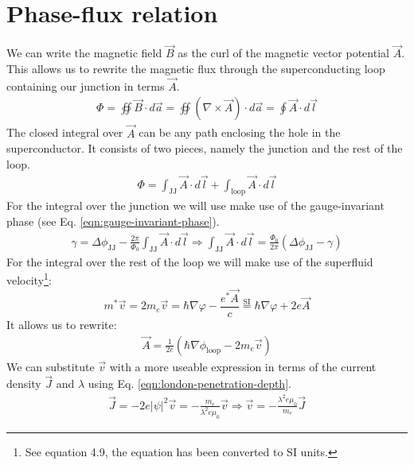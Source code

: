 \section{Phase-flux relation}
\label{app:derivation-phase-flux-relation}
We can write the magnetic field $\vec{B}$ as the curl of the magnetic vector potential $\vec{A}$. This allows us to rewrite the magnetic flux through the superconducting loop containing our junction in terms $\vec{A}$.
\begin{align}
	\Phi = \oiint \vec{B} \cdot d\vec{a} = \oiint \left(\nabla \times \vec{A}\right) \cdot d\vec{a} = \oint \vec{A} \cdot d\vec{l}
\end{align}
The closed integral over $\vec{A}$ can be any path enclosing the hole in the superconductor. It consists of two pieces, namely the junction and the rest of the loop.
\begin{align}
	\Phi = \int_{\text{JJ}} \vec{A} \cdot d\vec{l} + \int_{\text{loop}} \vec{A} \cdot d\vec{l}
	\label{eqn:magnetic-potential-integral}
\end{align}
For the integral over the junction we will use make use of the gauge-invariant phase (see Eq. \ref{eqn:gauge-invariant-phase}).
\begin{align}
	\gamma = \Delta\phi_{\text{JJ}} - \frac{2\pi}{\Phi_0}\int_{\text{JJ}}\vec{A} \cdot d\vec{l} \Rightarrow \int_{\text{JJ}}\vec{A} \cdot d\vec{l} = \frac{\Phi_0}{2\pi} \left(\Delta\phi_{\text{JJ}} - \gamma\right)
\end{align}
For the integral over the rest of the loop we will make use of the superfluid velocity\footnote{See  equation 4.9, the equation has been converted to SI units.}:
\begin{equation}
	m^*\vec{v} = 2m_e\vec{v} = \hbar \nabla \varphi - \frac{e^*\vec{A}}{c} \stackrel{\text{SI}}{=} \hbar \nabla \varphi + 2e\vec{A}
	\label{eqn:superfluid-velocity}
\end{equation}
It allows us to rewrite:
\begin{align}
	\vec{A} = \frac{1}{2e}\left(\hbar \nabla \phi_{\text{loop}} - 2m_e\vec{v}\right)
\end{align}
We can substitute $\vec{v}$ with a more useable expression in terms of the current density $\vec{J}$ and $\lambda$ using Eq. \ref{eqn:london-penetration-depth}.
\begin{align}
	\vec{J} = -2e|\psi|^2\vec{v} = -\frac{m_e}{\lambda^2e\mu_0}\vec{v} \Rightarrow \vec{v} = -\frac{\lambda^2e\mu_0}{m_e}\vec{J}
\end{align}
